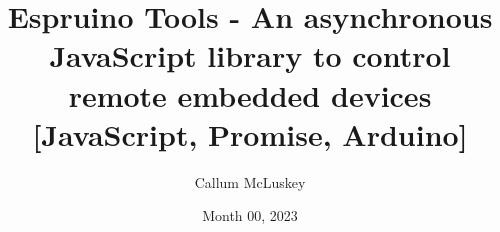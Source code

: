 \documentclass{l4proj}
\begin{document}
\title{Espruino Tools - An asynchronous JavaScript library to control remote embedded devices [JavaScript, Promise, Arduino]}
\author{Callum McLuskey}
\date{Month 00, 2023}

\maketitle

\begin{abstract}
   
\end{abstract}


%
%
%
\educationalconsent


\tableofcontents

%
%
%
%
%
%
%
%
\end{document}
